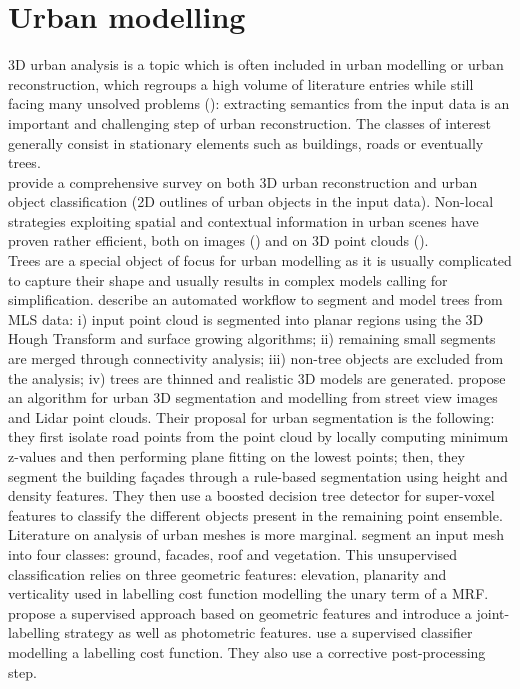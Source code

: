 \documentclass{kththesis}
\begin{document}
\section{Urban modelling}
3D urban analysis is a topic which is often included in urban modelling or urban reconstruction, which regroups a high volume of literature entries while still facing many unsolved problems (\textcite{UrbanReconstructionSurvey}): extracting semantics from the input data is an important and challenging step of urban reconstruction. The classes of interest generally consist in stationary elements such as buildings, roads or eventually trees. \\
\textcite{RottensteinerSurvey} provide a comprehensive survey on both 3D urban reconstruction and  urban object classification (2D outlines of
urban objects in the input data).   Non-local strategies exploiting spatial and contextual information in urban scenes have proven rather efficient, both on images (\textcite{Volpi2015, MontoyaZegarra2015SemanticSO}) and on 3D point clouds (\textcite{Lai2014, NIEMEYER2014152}). \\
Trees are a special object of focus for urban modelling as it is usually complicated to capture their shape and usually results in complex models calling for simplification. \textcite{Rutzinger2011} describe an automated workflow to
segment and model trees from MLS data: i) input point cloud is segmented into planar regions using the 3D Hough Transform and surface growing algorithms; ii) remaining small segments are merged through connectivity analysis; iii) non-tree objects are excluded from
the analysis; iv) trees are thinned  and realistic 3D models are 
generated. \textcite{Finnish3Dpc} propose an algorithm for urban 3D segmentation and modelling from street view images and Lidar point clouds. Their proposal for urban segmentation is the following: they first isolate road points from the point cloud by locally computing minimum z-values and then performing plane fitting on the lowest points; then, they segment the building façades through a rule-based segmentation using height and density features.  They then use a boosted decision tree detector for super-voxel
features to classify the different objects present in the remaining point ensemble. \\
Literature on analysis of urban meshes is more marginal. \textcite{verdie} segment an input mesh into four classes: ground, facades, roof and vegetation. This unsupervised classification relies on three geometric features: elevation, planarity and verticality used in labelling cost function modelling the unary term of a MRF.  \textcite{rouhani} propose a supervised approach based on \textcite{verdie} geometric features and introduce a joint-labelling strategy as well as photometric features. \textcite{martinovic2015} use a supervised classifier modelling a labelling cost function. They also use a corrective post-processing step. 
\end{document}
